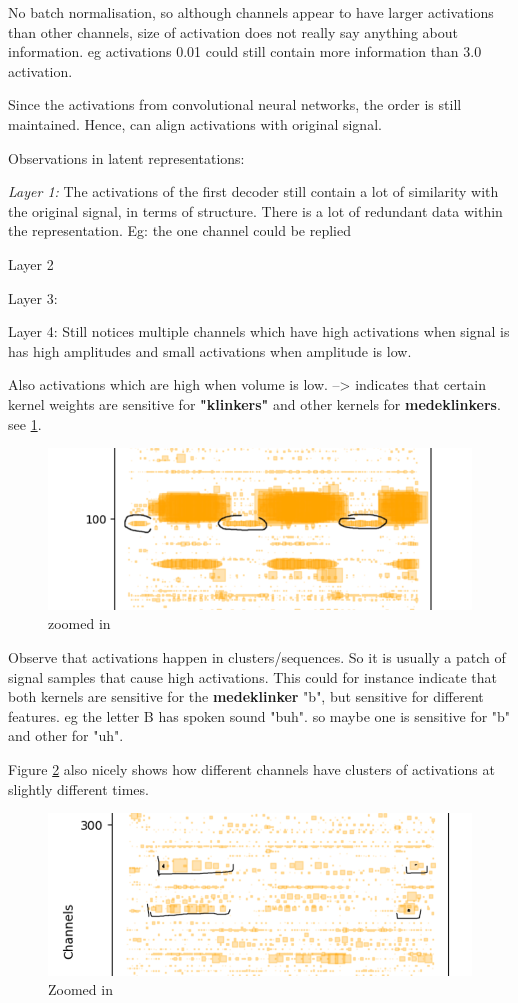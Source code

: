 No batch normalisation, so although channels appear to have larger activations than other channels, size of activation does not really say anything about information. eg activations 0.01 could still contain more information than 3.0 activation.

Since the activations from convolutional neural networks, the order is still maintained. Hence, can align activations with original signal.

Observations in latent representations:

\textit{Layer 1:}
The activations of the first decoder still contain a lot of similarity with the original signal, in terms of structure. There is a lot of redundant data within the representation. Eg: the one channel could be replied 

Layer 2

Layer 3:

Layer 4:
Still notices multiple channels which have high activations when signal is has high amplitudes and small activations when amplitude is low. 

Also activations which are high when volume is low. --> indicates that certain kernel weights are sensitive for \textbf{"klinkers"} and other kernels for \textbf{medeklinkers}. see \ref{fig:screenshot008}.

\begin{figure}[h]
	\centering
	\includegraphics[width=0.7\linewidth]{screenshot008}
	\caption{zoomed in}
	\label{fig:screenshot008}
\end{figure}


Observe that activations happen in clusters/sequences. So it is usually a patch of signal samples that cause high activations. This could for instance indicate that both kernels are sensitive for the \textbf{medeklinker} "b", but sensitive for different features. eg the letter B has spoken sound "buh". so maybe one is sensitive for "b" and other for "uh".

Figure \ref{fig:layer4 zoomed in} also nicely shows how different channels have clusters of activations at slightly different times. 

\begin{figure}[h]
	\centering
	\includegraphics[width=0.7\linewidth]{screenshot010}
	\caption{Zoomed in}
	\label{fig:layer4 zoomed in}
\end{figure}



